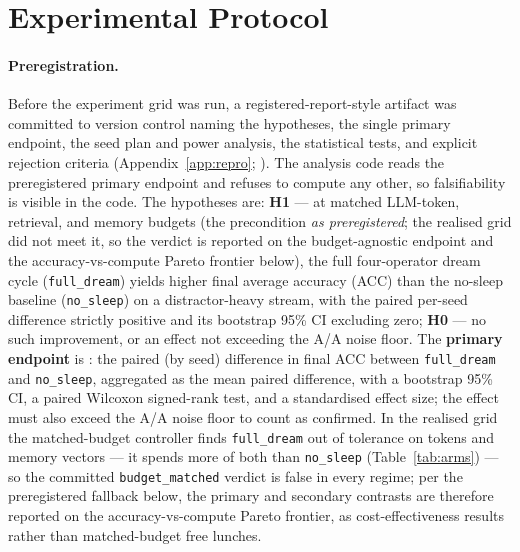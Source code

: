 \section{Experimental Protocol}\label{sec:protocol}

\paragraph{Preregistration.} Before the experiment grid was run, a
registered-report-style artifact was committed to version control naming the
hypotheses, the single primary endpoint, the seed plan and power analysis, the
statistical tests, and explicit rejection criteria (Appendix~\ref{app:repro};
\citealp{pineau2021reproducibility}). The analysis code reads the preregistered
primary endpoint and refuses to compute any other, so falsifiability is visible
in the code. The hypotheses are: \textbf{H1} --- at matched LLM-token,
retrieval, and memory budgets (the precondition \emph{as preregistered}; the
realised grid did not meet it, so the verdict is reported on the budget-agnostic
endpoint and the accuracy-vs-compute Pareto frontier below), the full
four-operator dream cycle
(\texttt{full\_dream}) yields higher final average accuracy (ACC) than the
no-sleep baseline (\texttt{no\_sleep}) on a distractor-heavy stream, with the
paired per-seed difference strictly positive and its bootstrap 95\% CI excluding
zero; \textbf{H0} --- no such improvement, or an effect not exceeding the A/A
noise floor. The \textbf{primary endpoint} is
\texttt{\SWprimaryEndpoint}: the paired (by seed) difference in final ACC between
\texttt{full\_dream} and \texttt{no\_sleep}, aggregated as the mean paired
difference, with a bootstrap 95\% CI, a paired Wilcoxon signed-rank test, and a
standardised effect size; the effect must also exceed the A/A noise floor to
count as confirmed. In the realised grid the matched-budget controller finds
\texttt{full\_dream} out of tolerance on tokens and memory vectors --- it spends
more of both than \texttt{no\_sleep} (Table~\ref{tab:arms}) --- so the committed
\texttt{budget\_matched} verdict is false in every regime; per the preregistered
fallback below, the primary and secondary contrasts are therefore reported on the
accuracy-vs-compute Pareto frontier, as cost-effectiveness results rather than
matched-budget free lunches.

